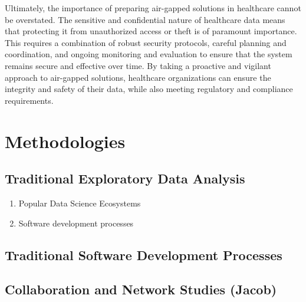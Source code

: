 \documentclass{amia}
\begin{document}
Ultimately, the importance of preparing air-gapped solutions in healthcare cannot be overstated. The sensitive and confidential nature of healthcare data means that protecting it from unauthorized access or theft is of paramount importance. This requires a combination of robust security protocols, careful planning and coordination, and ongoing monitoring and evaluation to ensure that the system remains secure and effective over time. By taking a proactive and vigilant approach to air-gapped solutions, healthcare organizations can ensure the integrity and safety of their data, while also meeting regulatory and compliance requirements.

\section{Methodologies}

\subsection{Traditional Exploratory Data Analysis}

        \begin{enumerate}
            \item Popular Data Science Ecosystems
            \item Software development processes
        \end{enumerate}

\subsection{Traditional Software Development Processes} 

\subsection{Collaboration and Network Studies (Jacob)}
\end{document}
